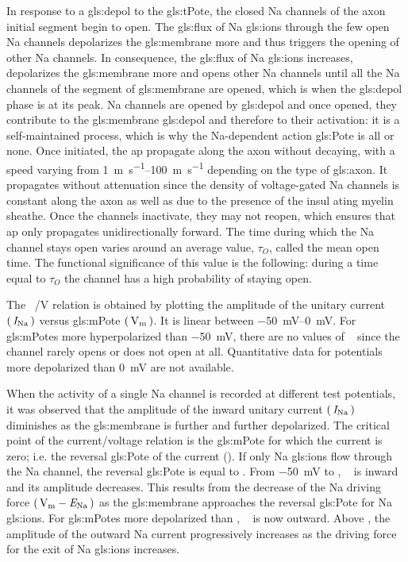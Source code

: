 \documentclass[class={myRUCProject}, crop=false]{standalone}
\begin{document}
In response to a \gls{gls:depol} to the \gls{gls:tPote}, the closed \gls{Na} channels of the axon initial segment begin to open. The \gls{gls:flux} of \gls{Na} \glspl{gls:ion} through the few open \gls{Na} channels depolarizes the \gls{gls:membrane} more and thus triggers the opening of other \gls{Na} channels. In consequence, the \gls{gls:flux} of \gls{Na} \glspl{gls:ion} increases, depolarizes the \gls{gls:membrane} more and opens other \gls{Na} channels until all the \gls{Na} channels of the segment of \gls{gls:membrane} are opened, which is when the \gls{gls:depol} phase is at its peak. \gls{Na} channels are opened by \gls{gls:depol} and once opened, they contribute to the \gls{gls:membrane} \gls{gls:depol} and therefore to their activation: it is a self-maintained process, which is why the  \gls{Na}-dependent  action  \gls{gls:Pote}  is  all  or  none. Once initiated, the \gls{ap} propagate along the axon without decaying, with a speed varying from \qtyrange{1}{100}{\m\per\s} depending on the type of \gls{gls:axon}.  It  propagates  without  attenuation  since  the  density of voltage-gated \gls{Na} channels is constant along the  axon as well as due to the presence of the insul ating myelin sheathe.  Once the channels inactivate, they may not reopen, which ensures that \gls{ap} only propagates  unidirectionally forward. 
The time during which the \gls{Na} channel stays open varies around an average value, \(\tau_O\), called the mean open time. The functional significance of this value is the following: during a time equal to \(\tau_O\) the channel has a high probability of staying open. 

The \unit[per-mode = symbol]{\cur\sodium\per\V} relation is obtained by plotting the amplitude of the unitary current \(\br{\cur\sodium}\) versus \gls{gls:mPote} \(\br{\unit{\V\membrane}}\). It is linear between \qtyrange{-50}{0}{\mV}. For \glspl{gls:mPote} more hyperpolarized than \qty{-50}{\mV}, there are no values of \unit{\cur\sodium} since the channel rarely opens or does not open at all. Quantitative data for potentials more depolarized than \qty{0}{\mV} are not available.

When the activity of a single \gls{Na} channel is  recorded at different test potentials, it was observed that the amplitude of the inward unitary current \(\br{\cur\sodium}\) diminishes as the \gls{gls:membrane} is further and further depolarized. The critical point of the current/voltage relation is the \gls{gls:mPote} for which the current is zero; i.e. the reversal \gls{gls:Pote} of the current (\equilibria\reverse). If only \gls{Na} \glspl{gls:ion} flow through the \gls{Na} channel, the reversal \gls{gls:Pote} is equal to \equilibria\sodium. From \qty{-50}{\mV} to \equilibria\reverse, \unit{\cur\sodium} is inward and its amplitude decreases. This results from the decrease of the \gls{Na} driving force \(\br{\unit{\V\membrane}-\equilibria\sodium}\) as the \gls{gls:membrane} approaches the reversal \gls{gls:Pote} for \gls{Na} \glspl{gls:ion}. For \glspl{gls:mPote} more depolarized than \equilibria\reverse, \unit{\cur\sodium} is now outward. Above \equilibria\reverse, the amplitude of the outward \gls{Na} current progressively increases as the driving force for the exit of \gls{Na} \glspl{gls:ion} increases. 
\end{document}
